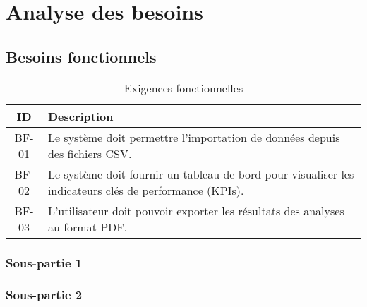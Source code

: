 \section{Analyse des besoins}
\label{chap:analyse_besoins}

\subsection{Besoins fonctionnels}
\label{sec:besoins_fonctionnels}
\begin{table}[H]
    \centering
    \caption{Exigences fonctionnelles}
    \label{tab:besoins_fonctionnels}
    \begin{tabularx}{\textwidth}{c X}
        \toprule
        \textbf{ID} & \textbf{Description} \\
        \midrule
        BF-01 & Le système doit permettre l'importation de données depuis des fichiers CSV. \\
        BF-02 & Le système doit fournir un tableau de bord pour visualiser les indicateurs clés de performance (KPIs). \\
        BF-03 & L'utilisateur doit pouvoir exporter les résultats des analyses au format PDF. \\
        \bottomrule
    \end{tabularx}
\end{table}

\subsubsection{Sous-partie 1}
\label{ssec:besoins_fonc_1}

\subsubsection{Sous-partie 2}
\label{ssec:besoins_fonc_2}

